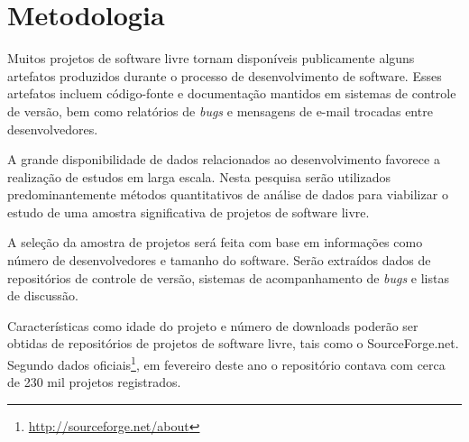 \documentclass{article}
\begin{document}

\section{Metodologia}



Muitos projetos de software livre tornam disponíveis publicamente alguns
artefatos produzidos durante o processo de desenvolvimento de software. Esses
artefatos incluem código-fonte e documentação mantidos em sistemas de controle
de versão, bem como relatórios de \emph{bugs} e mensagens de e-mail trocadas
entre desenvolvedores. 

A grande disponibilidade de dados relacionados ao desenvolvimento favorece a
realização de estudos em larga escala. Nesta pesquisa serão utilizados
predominantemente métodos quantitativos de análise de dados para viabilizar o
estudo de uma amostra significativa de projetos de software livre.

A seleção da amostra de projetos será feita com base em informações como número
de desenvolvedores e tamanho do software. Serão extraídos dados de repositórios
de controle de versão, sistemas de acompanhamento de \emph{bugs} e listas de
discussão.


Características como idade do projeto e número de downloads poderão ser
obtidas de repositórios de projetos de software livre, tais como o
SourceForge.net. Segundo dados
oficiais\footnote{\url{http://sourceforge.net/about}}, em fevereiro deste ano
o repositório contava com cerca de 230 mil projetos registrados.
\end{document}
